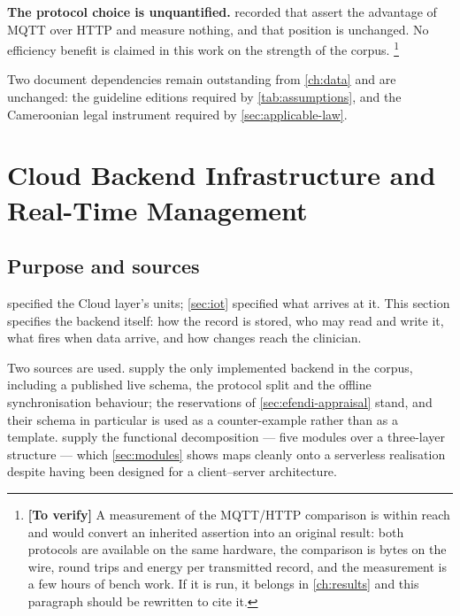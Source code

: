 \documentclass[12pt,a4paper,oneside]{report}
\newcommand{\verify}[1]{\footnote{\textbf{[To verify]} #1}}
\begin{document}
\textbf{The protocol choice is unquantified.}  recorded that \textcite{efendi2025} assert the advantage of MQTT over HTTP and measure nothing, and that position is unchanged. No efficiency benefit is claimed in this work on the strength of the corpus.%
\verify{A measurement of the MQTT/HTTP comparison is within reach and would convert an inherited assertion into an original result: both protocols are available on the same hardware, the comparison is bytes on the wire, round trips and energy per transmitted record, and the measurement is a few hours of bench work. If it is run, it belongs in \cref{ch:results} and this paragraph should be rewritten to cite it.}

Two document dependencies remain outstanding from \cref{ch:data} and are unchanged: the guideline editions required by \cref{tab:assumptions}, and the Cameroonian legal instrument required by \cref{sec:applicable-law}.

\section{Cloud Backend Infrastructure and Real-Time Management}\label{sec:backend}

\subsection*{Purpose and sources}

 specified the Cloud layer's units; \cref{sec:iot} specified what arrives at it. This section specifies the backend itself: how the record is stored, who may read and write it, what fires when data arrive, and how changes reach the clinician.

Two sources are used. \Textcite{efendi2025} supply the only implemented backend in the corpus, including a published live schema, the protocol split and the offline synchronisation behaviour; the reservations of \cref{sec:efendi-appraisal} stand, and their schema in particular is used as a counter-example rather than as a template. \Textcite{yazdani2018} supply the functional decomposition --- five modules over a three-layer structure --- which \cref{sec:modules} shows maps cleanly onto a serverless realisation despite having been designed for a client--server architecture.
\end{document}
